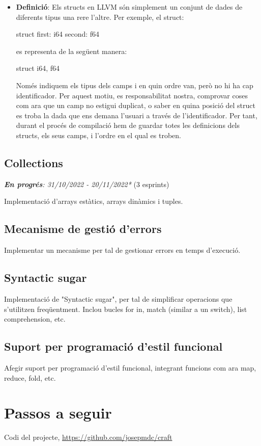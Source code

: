 ﻿\documentclass{article}
\begin{document}
\begin{itemize}
\item \textbf{Definició}: Els structs en LLVM són simplement un conjunt
    de dades de diferents tipus una rere l'altre. Per exemple, el struct:

    \begin{code}
        struct {
            first: i64
            second: f64
        }
    \end{code}

    es representa de la següent manera:

    \begin{code}
        struct { i64, f64 }
    \end{code}

    Només indiquem els tipus dels camps i en quin ordre van, però no hi ha cap
    identificador. Per aquest motiu, es responsabilitat nostra, comprovar coses
    com ara que un camp no estigui duplicat, o saber en quina posició del struct
    es troba la dada que ens demana l'usuari a través de l'identificador. Per
    tant, durant el procés de compilació hem de guardar totes les definicions
    dels structs, els seus camps, i l'ordre en el qual es troben.
\end{itemize}

\subsection{Collections}
\textit{\textbf{En progrés}: 31/10/2022 - 20/11/2022*} (3 esprints)

Implementació d'arrays estàtics, arrays dinàmics i tuples.

\subsection{Mecanisme de gestió d'errors}
Implementar un mecanisme per tal de gestionar errors en temps d'execució.

\subsection{Syntactic sugar}
Implementació de "Syntactic sugar", per tal de simplificar operacions que
s'utilitzen freqüentment. Inclou bucles for in, match (similar a un switch),
list comprehension, etc.

\subsection{Suport per programació d'estil funcional}
Afegir suport per programació d'estil funcional, integrant funcions com ara map,
reduce, fold, etc.

\section{Passos a seguir}

\begin{thebibliography}{9}

 Codi del projecte, \url{https://github.com/josepmdc/craft}

\end{thebibliography}
\end{document}
